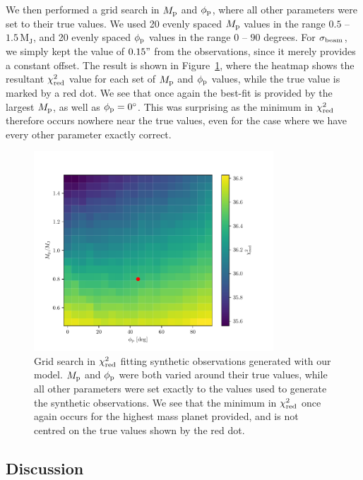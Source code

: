 We then performed a grid search in $M_{\rm p}$ and $\phi_{\rm p}$, where all other parameters were set to their true values.
We used 20 evenly spaced $M_{\rm p}$ values in the range $0.5$ -- $1.5 \, \mathrm{M_J}$, and 20 evenly spaced $\phi_{\rm p}$ values in the range $0$ -- $90$ degrees.
For $\sigma_{\rm beam}$, we simply kept the value of $0.15"$ from the observations, since it merely provides a constant offset.
The result is shown in Figure~\ref{fig:planet_grid_search}, where the heatmap shows the resultant $\chi^2_{\rm red}$ value for each set of $M_{\rm p}$ and $\phi_{\rm p}$ values, while the true value is marked by a red dot.
We see that once again the best-fit is provided by the largest $M_{\rm p}$, as well as $\phi_{\rm p}= 0^\circ$.
This was surprising as the minimum in $\chi^2_{\rm red}$ therefore occurs nowhere near the true values, even for the case where we have every other parameter exactly correct. 
\begin{figure}
    \centering
    \includegraphics[width = 0.8\textwidth]{figures/planet_mass_az_grid_var.pdf}
    \caption{Grid search in $\chi^2_{\rm red}$ fitting synthetic observations generated with our model. $M_{\rm p}$ and $\phi_{\rm p}$ were both varied around their true values, while all other parameters were set exactly to the values used to generate the synthetic observations. We see that the minimum in $\chi^2_{\rm red}$ once again occurs for the highest mass planet provided, and is not centred on the true values shown by the red dot.}
    \label{fig:planet_grid_search}
\end{figure}

\subsection{Discussion}


